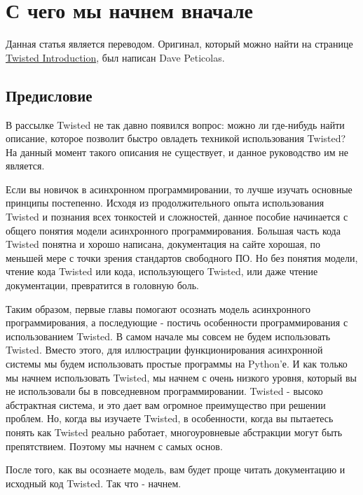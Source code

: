 
\section{С чего мы начнем вначале\label{sec:part1}}



    Данная статья является переводом. Оригинал, который можно найти на странице  
\href{http://krondo.com/?page\_id=1327}{Twisted Introduction},
был написан Dave Peticolas.


\subsection{Предисловие}


    В рассылке Twisted не так давно появился вопрос:  
можно ли где-нибудь найти описание, которое 
позволит быстро овладеть техникой использования Twisted? 
На данный момент такого описания не существует, и данное 
руководство им не является.


Если вы новичок в асинхронном программировании, то  
лучше изучать основные принципы постепенно. 
Исходя из продолжительного опыта использования Twisted и 
познания всех тонкостей и сложностей, данное пособие начинается с 
общего понятия модели асинхронного программирования. 
Большая часть кода Twisted понятна и 
хорошо написана, документация на сайте хорошая, по меньшей 
мере с точки зрения стандартов свободного ПО. Но без понятия модели, 
чтение кода Twisted или кода, использующего Twisted, или даже чтение 
документации, превратится в головную боль.


Таким образом, первые главы помогают 
осознать модель асинхронного программирования, а последующие - 
постичь особенности программирования с использованием Twisted. 
В самом начале мы совсем не будем использовать Twisted. 
Вместо этого, для иллюстрации функционирования асинхронной системы 
мы будем использовать простые программы на Python'е. И как только мы 
начнем использовать Twisted, мы начнем с очень низкого уровня, который 
вы не использовали бы в повседневном программировании. Twisted - 
высоко абстрактная система, и это дает вам огромное преимущество при решении 
проблем. Но, когда вы изучаете Twisted, в особенности, когда вы 
пытаетесь понять как Twisted реально работает, многоуровневые абстракции могут 
быть препятствием. Поэтому мы начнем с самых основ.


После того, как вы осознаете модель, вам будет проще 
читать документацию и исходный код Twisted. Так что - начнем. 


